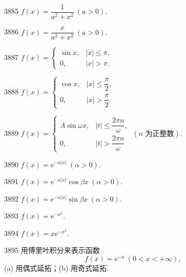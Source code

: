 \begin{prob}[S]{3885}
$f(x) = \dfrac{1}{a^2 + x^2}\ (a > 0).$
\end{prob}

\begin{prob}[S]{3886}
$f(x) = \dfrac{x}{a^2 + x^2}\ (a > 0).$
\end{prob}

\begin{prob}[S]{3887}
$f(x) = \begin{cases} \sin x, & |x| \leqslant \pi, \\ 0, & |x| > \pi. \end{cases}$
\end{prob}

\begin{prob}[S]{3888}
$f(x) = \begin{cases} \cos x, & |x| \leqslant \dfrac{\pi}{2}, \\ 0, & |x| > \dfrac{\pi}{2}. \end{cases}$
\end{prob}

\begin{prob}[S]{3889}
$f(x) = \begin{cases} A\sin \omega x, & |t| \leqslant \dfrac{2\pi n}{\omega}, \\ 0, & |t| > \dfrac{2\pi n}{\omega} \end{cases}\ (n\text{ 为正整数}).$
\end{prob}

\begin{prob}[S]{3890}
$f(x) = \mathrm{e}^{-\alpha |x|}\ (\alpha > 0).$
\end{prob}

\begin{prob}[S]{3891}
$f(x) = \mathrm{e}^{-\alpha |x|} \cos \beta x\ (\alpha > 0).$
\end{prob}

\begin{prob}[S]{3892}
$f(x) = \mathrm{e}^{-\alpha |x|} \sin \beta x\ (\alpha > 0).$
\end{prob}

\begin{prob}[S]{3893}
$f(x) = \mathrm{e}^{-x^2}.$
\end{prob}

\begin{prob}[S]{3894}
$f(x) = x\mathrm{e}^{-x^2}.$
\end{prob}

\begin{prob}[M]{3895}
用傅里叶积分来表示函数
\[
f(x) = \mathrm{e}^{-x}\ (0 < x < +\infty),
\]
(a) 用偶式延拓；\qquad (b) 用奇式延拓.
\end{prob}

